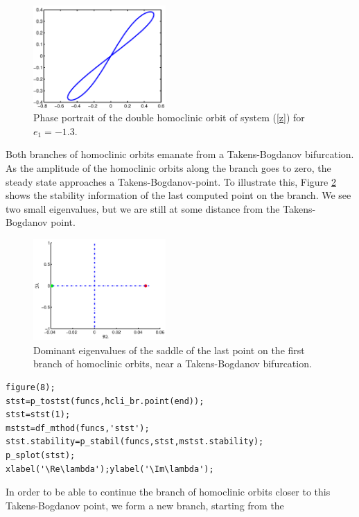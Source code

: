 \documentclass[10pt]{scrartcl}
\begin{document}
{\begin{figure}[ht]
  \begin{center}
    \includegraphics[width=0.45\textwidth]{fig/hom_demfig07}
    \caption{\label{demo3-7}Phase portrait of the double homoclinic orbit of system
      (\ref{z}) for $e_{1}=-1.3$.}
  \end{center}
\end{figure}
Both branches of homoclinic orbits emanate from a Takens-Bogdanov
bifurcation.  As the amplitude of the homoclinic orbits along the
branch goes to zero, the steady state approaches a
Takens-Bogdanov-point. To illustrate this, Figure \ref{demo3-8} shows
the stability information of the last computed point on the branch. We
see two small eigenvalues, but we are still at some distance from the
Takens-Bogdanov point.
\begin{figure}
  \begin{center}
    \includegraphics[width=0.45\textwidth]{fig/hom_demfig08}
    \caption{Dominant eigenvalues of the saddle of the last point on the first branch
      of homoclinic orbits,
      near a Takens-Bogdanov bifurcation.\label{demo3-8}}
  \end{center}
\end{figure}
\begin{lstlisting}
figure(8);
stst=p_tostst(funcs,hcli_br.point(end));
stst=stst(1);
mstst=df_mthod(funcs,'stst');
stst.stability=p_stabil(funcs,stst,mstst.stability);
p_splot(stst);
xlabel('\Re\lambda');ylabel('\Im\lambda');  
\end{lstlisting}
In order to be able to continue the branch of homoclinic orbits closer
to this Takens-Bogdanov point, we form a new branch, starting from the
}
\end{document}
